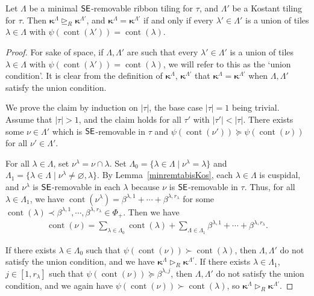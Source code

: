\documentclass[Unicode,ALCO]{cedram}
\newcommand{\0}{{\bar 0}}
\newcommand{\ssee}{{\sf SE}}
\newcommand{\bkap}{\boldsymbol{\kappa}}
\def\cont{{\operatorname{cont}}}
\begin{document}
\begin{lemma}\label{othersmaller}
Let \(\Lambda\) be a minimal \(\ssee\)-removable ribbon tiling for \(\tau\), and \(\Lambda'\) be a Kostant tiling for \(\tau\). Then \(\bkap^\Lambda \trianglerighteq_R \bkap^{\Lambda'}\), and \(\bkap^\Lambda = \bkap^{\Lambda'}\) if and only if every \(\lambda' \in \Lambda'\) is a union of tiles \(\lambda \in \Lambda\) with \(\psi(\cont(\lambda')) = \cont(\lambda)\).
\end{lemma}
\begin{proof}
For sake of space, if \(\Lambda, \Lambda'\) are such that every \(\lambda' \in \Lambda'\) is a union of tiles \(\lambda \in \Lambda\) with \(\psi(\cont(\lambda')) = \cont(\lambda)\), we will refer to this as the `union condition'. It is clear from the definition of \(\bkap^\Lambda\), \(\bkap^{\Lambda'}\) that \(\bkap^\Lambda = \bkap^{\Lambda'}\) when \(\Lambda, \Lambda'\) satisfy the union condition.

We prove the claim by induction on \(|\tau|\), the base case \(|\tau| = 1\) being trivial. Assume that \(|\tau| >1\), and the claim holds for all \(\tau'\) with \(|\tau'| < |\tau|\). There exists some \(\nu \in \Lambda'\) which is \(\ssee\)-removable in \(\tau\) and \(\psi(\cont(\nu')) \succeq \psi(\cont(\nu))\) for all \(\nu' \in \Lambda'\).

For all \(\lambda \in \Lambda\), set \(\nu^\lambda = \nu \cap \lambda\). Set \(\Lambda_0 = \{\lambda \in \Lambda \mid \nu^\lambda = \lambda\}\) and \(\Lambda_1 = \{\lambda \in \Lambda \mid \nu^\lambda \neq \varnothing, \lambda\}\).
By Lemma~\ref{minremtabisKos}, each \(\lambda \in \Lambda\) is cuspidal, and \(\nu^\lambda\) is \(\ssee\)-removable in each \(\lambda\) because \(\nu\) is \(\ssee\)-removable in \(\tau\). Thus, for all \(\lambda \in \Lambda_1\), we have
 \(
\cont(\nu^\lambda) = \beta^{\lambda, 1} + \cdots + \beta^{\lambda, r_\lambda}
\)
for some \(\cont(\lambda) \prec \beta^{\lambda, 1}, \cdots, \beta^{\lambda, r_\lambda} \in \Phi_+\). Then we have
\begin{align*}
\cont(\nu) = \sum_{\lambda \in \Lambda_0} \cont(\lambda) + \sum_{\Lambda \in \Lambda_1} \beta^{\lambda, 1} + \cdots + \beta^{\lambda, r_{\lambda}}.
\end{align*}

If there exists \(\lambda \in \Lambda_0\) such that \(\psi(\cont(\nu)) \succ \cont(\lambda)\), then \(\Lambda, \Lambda'\) do not satisfy the union condition, and we have \(\bkap^\Lambda \triangleright_R \bkap^{\Lambda'}\). If there exists \(\lambda \in \Lambda_1\), \(j \in [1, r_\lambda]\) such that \(\psi(\cont(\nu)) \succeq \beta^{\lambda, j}\), then \(\Lambda, \Lambda'\) do not satisfy the union condition, and we again have \(\psi(\cont(\nu)) \succ \cont(\lambda)\), so \(\bkap^\Lambda \triangleright_R \bkap^{\Lambda'}\). 


\end{proof}
\end{document}
